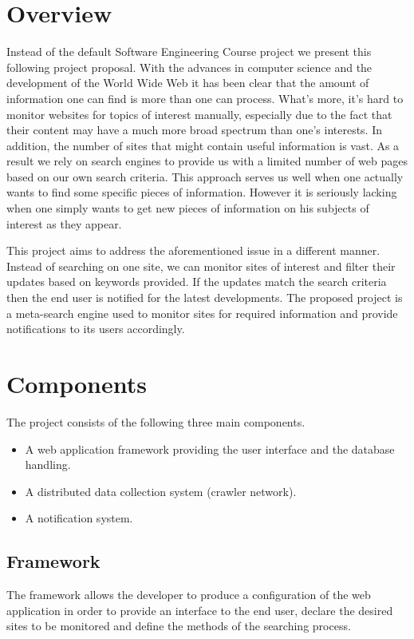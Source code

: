 \documentclass[a4paper,10pt]{article} \usepackage{anysize}
\begin{document}



\section{Overview}
    Instead of the default Software Engineering Course project we present
    this following project proposal. With the advances in computer science and
    the development of the World Wide Web it has been clear that the amount
    of information one can find is more than one can process. What's more, it's
    hard to monitor websites for topics of interest manually, especially due to
    the fact that their content may have a much more broad spectrum than one's
    interests. In addition, the number of sites that might contain useful
    information is vast. As a result we rely on search engines to provide us
    with a limited number of web pages based on our own search criteria. This
    approach serves us well when one actually wants to find some specific
    pieces of information. However it is seriously lacking when one simply
    wants to get new pieces of information on his subjects of interest as they
    appear. 

    This project aims to address the aforementioned issue in a different
    manner. Instead of searching on one site, we can monitor sites of
    interest and filter their updates based on keywords provided. If the
    updates match the search criteria then the end user is notified for the
    latest developments. The proposed project is a meta-search engine used to
    monitor sites for required information and provide notifications to its
    users accordingly. 

\section{Components}
    The project consists of the following three main components.
    \begin{itemize}
        \item A web application framework providing the user interface and the
            database handling.
        \item A distributed data collection system (crawler network).
        \item A notification system.
    \end{itemize}
    \subsection{Framework}
        The framework allows the developer to produce a configuration of the
        web application in order to provide an interface to the end user,
        declare the desired sites to be monitored and define the methods of
        the searching process.
\end{document}
